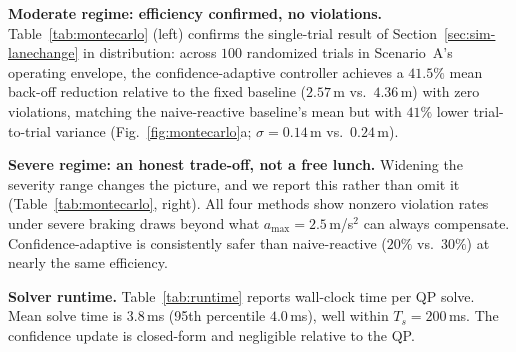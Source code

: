 
\textbf{Moderate regime: efficiency confirmed, no violations.}
Table~\ref{tab:montecarlo} (left) confirms the single-trial result of
Section~\ref{sec:sim-lanechange} in distribution: across $100$ randomized
trials in Scenario~A's operating envelope, the confidence-adaptive controller
achieves a $41.5\%$ mean back-off reduction relative to the fixed baseline
($2.57$\,m vs.\ $4.36$\,m) with zero violations, matching the
naive-reactive baseline's mean but with $41\%$ lower trial-to-trial variance
(Fig.~\ref{fig:montecarlo}a; $\sigma=0.14$\,m vs.\ $0.24$\,m).

\textbf{Severe regime: an honest trade-off, not a free lunch.}
Widening the severity range changes the picture, and we report this rather
than omit it (Table~\ref{tab:montecarlo}, right).
All four methods show nonzero violation rates under severe braking draws
beyond what $a_{\max}=2.5$\,m/s$^2$ can always compensate.
Confidence-adaptive is consistently safer than naive-reactive ($20\%$ vs.\
$30\%$) at nearly the same efficiency.

\textbf{Solver runtime.}
Table~\ref{tab:runtime} reports wall-clock time per QP solve.
Mean solve time is $3.8$\,ms (95th percentile $4.0$\,ms), well within
$T_s=200$\,ms.
The confidence update is closed-form and negligible relative to the QP.
